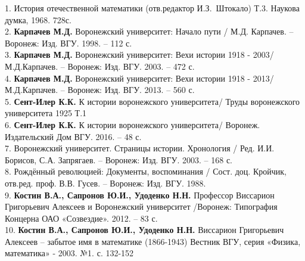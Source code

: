 1. История отечественной математики (отв.редактор И.З.~Штокало) Т.3. Наукова думка, 1968. 728с.\\
2. {\bf Карпачев М.Д.} Воронежский университет: Начало пути / М.Д. Карпачев. – Воронеж: Изд. ВГУ. 1998. – 112 с.\\
3. {\bf Карпачев М.Д.} Воронежский университет: Вехи истории 1918 - 2003/ М.Д.Карпачев. – Воронеж: Изд. ВГУ. 2003. – 472 с.\\
4. {\bf Карпачев М.Д.} Воронежский университет: Вехи истории 1918 - 2013/ М.Д.Карпачев. – Воронеж: Изд. ВГУ. 2013. – 560 с.\\
5. {\bf Сент-Илер К.К.} К истории воронежского университета/ Труды воронежского университета 1925 Т.1\\
6. {\bf Сент-Илер К.К.} К истории воронежского университета/ Воронеж. Издательский Дом ВГУ. 2016. – 48 с.\\
7. Воронежский университет. Страницы истории. Хронология / Ред. И.И. Борисов, С.А. Запрягаев. – Воронеж: Изд. ВГУ. 2003. – 168 с.\\
8. Рождённый революцией: Документы, воспоминания / Сост. доц. Кройчик, отв.ред. проф. В.В. Гусев. – Воронеж: Изд. ВГУ. 1988.\\
9. {\bf Костин В.А., Сапронов Ю.И., Удоденко Н.Н.} Профессор Виссарион Григорьевич Алексеев и Воронежский университет /Воронеж: Типография Концерна ОАО «Созвездие». 2012. –  83 с.\\
10. {\bf Костин В.А., Сапронов Ю.И., Удоденко Н.Н.} Виссарион Григорьевич Алексеев – забытое имя в математике (1866-1943) Вестник ВГУ, серия «Физика, математика» - 2003. №1.  с. 132-152\\



